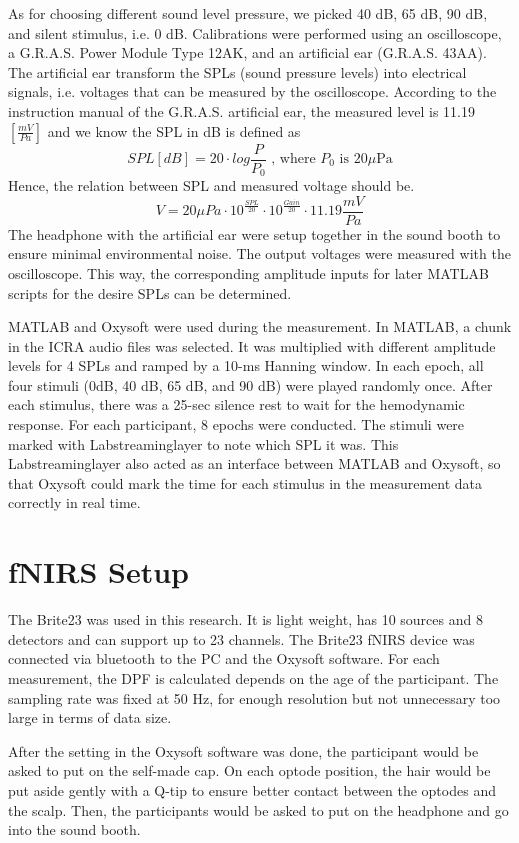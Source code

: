 As for choosing different sound level pressure, we picked 40 dB, 65 dB, 90 dB, and silent stimulus, i.e. 0 dB. Calibrations were performed using an oscilloscope, a G.R.A.S. Power Module Type 12AK,  and an artificial ear (G.R.A.S. 43AA). The artificial ear transform the SPLs (sound pressure levels) into electrical signals, i.e. voltages that can be measured by the oscilloscope. According to the instruction manual of the G.R.A.S. artificial ear, the measured level is 11.19 $[ \frac {mV}{Pa}]$ and we know the SPL in dB is defined as 
\[
SPL [dB] = 20 \cdot log \frac{P}{P_0} \text{ , where $P_0$ is $20 \mu$Pa}
\] 
Hence, the relation between SPL and measured voltage should be.
\[
V = 20{ \mu Pa} \cdot 10^{\frac {SPL}{20}}  \cdot 10^{\frac{Gain}{20}} \cdot 11.19 {\frac {mV}{Pa}} 
\]
The headphone with the artificial ear were setup together in the sound booth to ensure minimal environmental noise. The output voltages were measured with the oscilloscope. This way, the corresponding amplitude inputs for later MATLAB scripts for the desire SPLs can be determined.

MATLAB and Oxysoft were used during the measurement. In MATLAB, a chunk in the ICRA audio files was selected. It was multiplied with different amplitude levels for 4 SPLs and ramped by a 10-ms Hanning window. In each epoch, all four stimuli (0dB, 40 dB, 65 dB, and 90 dB) were played randomly once. After each stimulus, there was a 25-sec silence rest to wait for the hemodynamic response. For each participant, 8 epochs were conducted. The stimuli were marked with Labstreaminglayer to note which SPL it was. This Labstreaminglayer also acted as an interface between MATLAB and Oxysoft, so that Oxysoft could mark the time for each stimulus in the measurement data correctly in real time.

\section {fNIRS Setup}
The Brite23 was used in this research. It is light weight, has 10 sources and 8 detectors and can support up to 23 channels. The Brite23 fNIRS device was connected via bluetooth to the PC and the Oxysoft software. For each measurement, the DPF is calculated depends on the age of the participant. The sampling rate was fixed at 50 Hz, for enough resolution but not unnecessary too large in terms of data size.

After the setting in the Oxysoft software was done, the participant would be asked to put on the self-made cap. On each optode position, the hair would be put aside gently with a Q-tip to ensure better contact between the optodes and the scalp. Then, the participants would be asked to put on the headphone and go into the sound booth.



